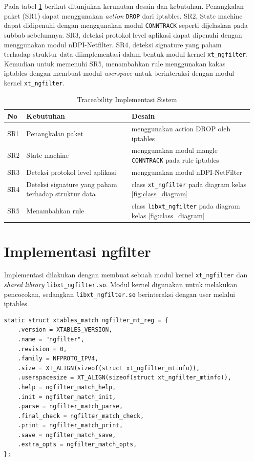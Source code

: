 Pada tabel \ref{table:system_traceability_implementation} berikut ditunjukan kerunutan desain dan kebutuhan. Penangkalan paket (SR1) dapat menggunakan \textit{action} \verb|DROP| dari iptables. SR2, State machine dapat didipenuhi dengan menggunakan modul \verb|CONNTRACK| seperti dijelaskan pada subbab sebelumnya. SR3, deteksi protokol level aplikasi dapat dipenuhi dengan menggunakan modul nDPI-Netfilter. SR4, deteksi signature yang paham terhadap struktur data diimplementasi dalam bentuk modul kernel \verb|xt_ngfilter|. Kemudian untuk memenuhi SR5, menambahkan rule menggunakan kakas iptables dengan membuat modul \textit{userspace} untuk berinteraksi dengan modul kernel \verb|xt_ngfilter|.

\begin{table}[H]
	\caption{Traceability Implementasi Sistem}
	\label{table:system_traceability_implementation}
	\begin{tabularx}{\textwidth}{|l|X|X|}
		\hline
		\textbf{No} & \textbf{Kebutuhan} & \textbf{Desain} \\ \hline
		SR1 & Penangkalan paket & menggunakan action DROP oleh iptables\\ \hline 
		SR2 & State machine &  menggunakan modul mangle \verb|CONNTRACK| pada rule iptables \\ \hline
		SR3 & Deteksi protokol level aplikasi & menggunakan modul nDPI-NetFilter\\ \hline
		SR4 & Deteksi signature yang paham terhadap struktur data& class \verb|xt_ngfilter| pada diagram kelas \ref{fig:class_diagram} \\ \hline
		SR5 & Menambahkan rule & class \verb|libxt_ngfilter| pada diagram kelas \ref{fig:class_diagram} \\ \hline
	\end{tabularx}
\end{table}


\section{Implementasi ngfilter}

Implementasi dilakukan dengan membuat sebuah modul kernel \verb|xt_ngfilter| dan  \textit{shared library} \verb|libxt_ngfilter.so|.
Modul kernel digunakan untuk melakukan pencocokan, sedangkan \verb|libxt_ngfilter.so| berinteraksi dengan user melalui iptables.

\begin{lstlisting}
static struct xtables_match ngfilter_mt_reg = {
	.version = XTABLES_VERSION,
	.name = "ngfilter",
	.revision = 0,
	.family = NFPROTO_IPV4,
	.size = XT_ALIGN(sizeof(struct xt_ngfilter_mtinfo)),
	.userspacesize = XT_ALIGN(sizeof(struct xt_ngfilter_mtinfo)),
	.help = ngfilter_match_help,
	.init = ngfilter_match_init,
	.parse = ngfilter_match_parse,
	.final_check = ngfilter_match_check,
	.print = ngfilter_match_print,
	.save = ngfilter_match_save,
	.extra_opts = ngfilter_match_opts,
};
\end{lstlisting}

